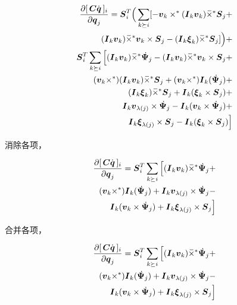 \documentclass[letterpaper, 10 pt, conference]{ieeetran}  %
\begin{document}
{\begin{enumerate}
   \begin{equation}
      \begin{aligned}
         \frac{\partial  [\,\C \qd\,]_{i}}{\partial \q_{j}} = \Phibar_{i}^{T} \Big(\sum_{k \succeq i} [-\v_{k} \times^* (\I_{k} \v_{k}) \crff \Phibar_{j} +\\
         (\I_{k} \v_{k}) \crff \v_{k}\times \Phibar_{j}  -  
         (\I_{k}  \xibar_{k})\crff \Phibar_{j} ]   \Big)  +   \\     \Phibar_{i}^{T}  \sum_{k \succeq i} \Big[  (\I_{k} \v_{k}) \crff \Psibardot_{j} -  (\I_{k} \v_{k}) \crff \v_{k}\times \Phibar_{j}  + \\
         (\v_{k} \times^*) (\I_{k} \v_{k}) \crff \Phibar_{j} +  
         (\v_{k} \times^*) \I_{k}(\Psibardot_{j})  +  \\
         (\I_{k} \xibar_{k} ) \crff \Phibar_{j} + 
         \I_{k}(\xibar_{k}  \times \Phibar_{j})  +  \\
         \I_{k} \v_{\lambda(j)} \times \Psibardot_{j} 
         -  \I_{k}( \v_{k} \times \Psibardot_{j})  +\\
         \I_{k}\xibar_{\lambda(j)} \times \Phibar_{j} -
         \I_{k} (\xibar_{k} \times \Phibar_{j}) \Big]  
        \label{partial_Cqdot_2}
      \end{aligned}
\end{equation}

消除各项，

   \begin{equation}
      \begin{aligned}
         \frac{\partial  [\,\C \qd\,]_{i}}{\partial \q_{j}} =     \Phibar_{i}^{T}  \sum_{k \succeq i} \Big[  (\I_{k} \v_{k}) \crff \Psibardot_{j}     +\\
         (\v_{k} \times^*) \I_{k}(\Psibardot_{j}) + 
         \I_{k} \v_{\lambda(j)} \times \Psibardot_{j} - \\
         \I_{k}( \v_{k} \times \Psibardot_{j})  + 
           \I_{k}\xibar_{\lambda(j)} \times \Phibar_{j}  \Big] 
        \label{partial_Cqdot_3}
      \end{aligned}
\end{equation}

合并各项，


   \begin{equation}
      \begin{aligned}
         \frac{\partial  [\,\C \qd\,]_{i}}{\partial \q_{j}} =     \Phibar_{i}^{T}  \sum_{k \succeq i} \Big[  (\I_{k} \v_{k}) \crff \Psibardot_{j}    + \\
           (\v_{k} \times^*) \I_{k}(\Psibardot_{j})  +
           \I_{k} \v_{\lambda(j)} \times \Psibardot_{j} - \\
           \I_{k}( \v_{k} \times \Psibardot_{j})  +  \I_{k}\xibar_{\lambda(j)} \times \Phibar_{j}  \Big]  
        \label{partial_Cqdot_4}
      \end{aligned}
\end{equation}


\end{enumerate}}
\end{document}
